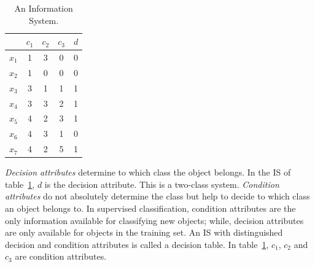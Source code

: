 \documentclass[authoryear,11pt]{elsarticle}
\begin{document}
  
 \begin{table}[htb]
		\caption{An Information System.} \label{tab_IS}
		\centering
 	\begin{tabular}{c||c|c|c||c}
 			  & $c_1$ & $c_2$ &  $c_3$ & $d$ \\
 		\hline \hline
		$x_1$ &   1   &    3  &  0  &   0   \\
		$x_2$ &   1   &    0  &  0  &   0   \\
		$x_3$ &   3   &    1  &  1  &   1   \\
		$x_4$ &   3   &    3  &  2  &   1   \\
		$x_5$ &   4   &    2  &  3  &   1   \\
		$x_6$ &   4   &    3  &  1  &   0   \\
		$x_7$ &   4   &    2  &  5  &   1   \\
 	\end{tabular}             
 \end{table}
 
   
  \textit{Decision attributes} determine to which class the object belongs. In the IS of
  table~\ref{tab_IS}, $d$ is the decision attribute. 
  This is a two-class system. \textit{Condition attributes} do not absolutely determine the class but help 
  to decide to which class an object belongs to. In supervised classification, condition attributes are the 
  only information available for classifying new objects; while, decision attributes are only 
  available for objects in the training set. An IS with distinguished decision and condition attributes is 
  called a decision table. In table~\ref{tab_IS}, $c_1$, $c_2$ and $c_3$ are condition attributes.
 
\end{document}
